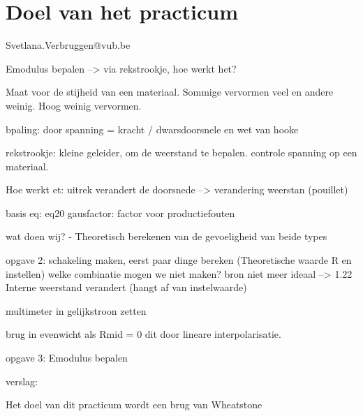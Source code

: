 \section{Doel van het practicum}

Svetlana.Verbruggen@vub.be

Emodulus bepalen
--> via rekstrookje, hoe werkt het?

Maat voor de stijheid van een materiaal. Sommige vervormen veel en andere weinig. Hoog weinig vervormen.

bpaling: door spanning = kracht / dwarsdoorsnele en wet van hooke

rekstrookje: kleine geleider, om de weerstand te bepalen. controle spanning op een materiaal.

Hoe werkt et: uitrek verandert de doorsnede --> verandering weerstan (pouillet)

basis eq: eq20
gausfactor: factor voor productiefouten

wat doen wij?
- Theoretisch berekenen van de gevoeligheid van beide types

opgave 2: schakeling maken, eerst paar dinge bereken (Theoretische waarde R en instellen)
welke combinatie mogen we niet maken?
bron niet meer ideaal --> 1.22
Interne weerstand verandert (hangt af van instelwaarde)

multimeter in gelijkstroon zetten

brug in evenwicht als Rmid = 0
dit door lineare interpolarisatie.

opgave 3: Emodulus bepalen

verslag:

Het doel van dit practicum wordt een brug van Wheatstone


